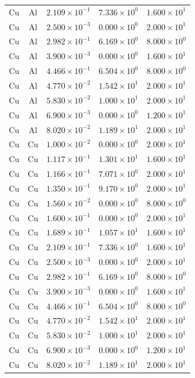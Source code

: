 \documentclass{article}
\begin{document}
\begin{longtable}{ccccc}
Cu &  Al & $2.109 \times 10^{-1}$ & $7.336 \times 10^{0}$ & $1.600 \times 10^{1}$ \\
Cu &  Al & $2.500 \times 10^{-3}$ & $0.000 \times 10^{0}$ & $2.000 \times 10^{1}$ \\
Cu &  Al & $2.982 \times 10^{-1}$ & $6.169 \times 10^{0}$ & $8.000 \times 10^{0}$ \\
Cu &  Al & $3.900 \times 10^{-3}$ & $0.000 \times 10^{0}$ & $1.600 \times 10^{1}$ \\
Cu &  Al & $4.466 \times 10^{-1}$ & $6.504 \times 10^{0}$ & $8.000 \times 10^{0}$ \\
Cu &  Al & $4.770 \times 10^{-2}$ & $1.542 \times 10^{1}$ & $2.000 \times 10^{1}$ \\
Cu &  Al & $5.830 \times 10^{-2}$ & $1.000 \times 10^{1}$ & $2.000 \times 10^{1}$ \\
Cu &  Al & $6.900 \times 10^{-3}$ & $0.000 \times 10^{0}$ & $1.200 \times 10^{1}$ \\
Cu &  Al & $8.020 \times 10^{-2}$ & $1.189 \times 10^{1}$ & $2.000 \times 10^{1}$ \\
Cu &  Cu & $1.000 \times 10^{-2}$ & $0.000 \times 10^{0}$ & $2.000 \times 10^{1}$ \\
Cu &  Cu & $1.117 \times 10^{-1}$ & $1.301 \times 10^{1}$ & $1.600 \times 10^{1}$ \\
Cu &  Cu & $1.166 \times 10^{-1}$ & $7.071 \times 10^{0}$ & $2.000 \times 10^{1}$ \\
Cu &  Cu & $1.350 \times 10^{-1}$ & $9.170 \times 10^{0}$ & $2.000 \times 10^{1}$ \\
Cu &  Cu & $1.560 \times 10^{-2}$ & $0.000 \times 10^{0}$ & $8.000 \times 10^{0}$ \\
Cu &  Cu & $1.600 \times 10^{-1}$ & $0.000 \times 10^{0}$ & $2.000 \times 10^{1}$ \\
Cu &  Cu & $1.689 \times 10^{-1}$ & $1.057 \times 10^{1}$ & $1.600 \times 10^{1}$ \\
Cu &  Cu & $2.109 \times 10^{-1}$ & $7.336 \times 10^{0}$ & $1.600 \times 10^{1}$ \\
Cu &  Cu & $2.500 \times 10^{-3}$ & $0.000 \times 10^{0}$ & $2.000 \times 10^{1}$ \\
Cu &  Cu & $2.982 \times 10^{-1}$ & $6.169 \times 10^{0}$ & $8.000 \times 10^{0}$ \\
Cu &  Cu & $3.900 \times 10^{-3}$ & $0.000 \times 10^{0}$ & $1.600 \times 10^{1}$ \\
Cu &  Cu & $4.466 \times 10^{-1}$ & $6.504 \times 10^{0}$ & $8.000 \times 10^{0}$ \\
Cu &  Cu & $4.770 \times 10^{-2}$ & $1.542 \times 10^{1}$ & $2.000 \times 10^{1}$ \\
Cu &  Cu & $5.830 \times 10^{-2}$ & $1.000 \times 10^{1}$ & $2.000 \times 10^{1}$ \\
Cu &  Cu & $6.900 \times 10^{-3}$ & $0.000 \times 10^{0}$ & $1.200 \times 10^{1}$ \\
Cu &  Cu & $8.020 \times 10^{-2}$ & $1.189 \times 10^{1}$ & $2.000 \times 10^{1}$ \\
\hline
\end{longtable}
\egroup
\end{document}
